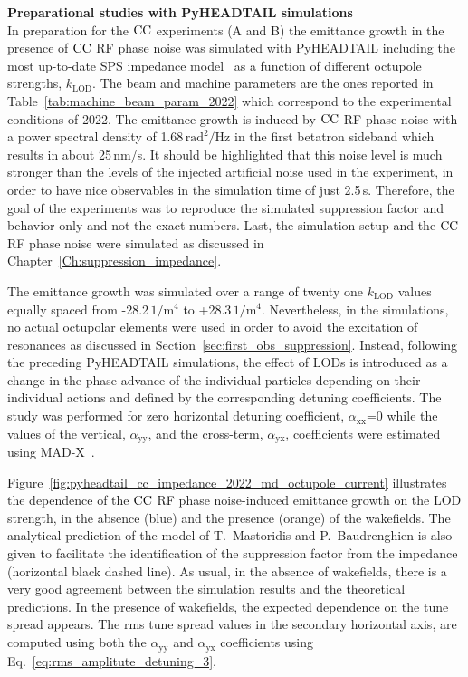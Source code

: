 \textbf{Preparational studies with PyHEADTAIL simulations}\\
In preparation for the ${\mathrm{CC}}$ experiments (A and B) the emittance growth in the presence of ${\mathrm{CC}}$ RF phase noise was simulated with PyHEADTAIL including the most up-to-date SPS impedance model~\cite{updated_sps_wakfields_model} as a function of different octupole strengths, $k_{\mathrm{LOD}}$. The beam and machine parameters are the ones reported in Table~\ref{tab:machine_beam_param_2022} which correspond to the experimental conditions of 2022. The emittance growth is induced by ${\mathrm{CC}}$ RF phase noise with a power spectral density of 1.68\,$\mathrm{rad^2/Hz}$ in the first betatron sideband which results in about 25\,nm/s. It should be highlighted that this noise level is much stronger than the levels of the injected artificial noise used in the experiment, in order to have nice observables in the simulation time of just 2.5\,s. Therefore, the goal of the experiments was to reproduce the simulated suppression factor and behavior only and not the exact numbers. Last, the simulation setup and the ${\mathrm{CC}}$ RF phase noise were simulated as discussed in Chapter~\ref{Ch:suppression_impedance}. 

The emittance growth was simulated over a range of twenty one $k_\mathrm{LOD}$ values equally spaced from -28.2\,$\mathrm{1/m^4}$ to +28.3\,$\mathrm{1/m^4}$. Nevertheless, in the simulations, no actual octupolar elements were used in order to avoid the excitation of resonances as discussed in Section~\ref{sec:first_obs_suppression}. Instead, following the preceding PyHEADTAIL simulations, the effect of LODs is introduced as a change in the phase advance of the individual particles depending on their individual actions and defined by the corresponding detuning coefficients. The study was performed for zero horizontal detuning coefficient, $\alpha_{\mathrm{xx}}$=0 while the values of the vertical, $\alpha_{\mathrm{yy}}$, and the cross-term, $\alpha_{\mathrm{yx}}$, coefficients were estimated using MAD-X~\cite{madx}.

Figure~\ref{fig:pyheadtail_cc_impedance_2022_md_octupole_current} illustrates the dependence of the ${\mathrm{CC}}$ RF phase noise-induced emittance growth on the LOD strength, in the absence (blue) and the presence (orange) of the wakefields. The analytical prediction of the model of T.~Mastoridis and P.~Baudrenghien is also given to facilitate the identification of the suppression factor from the impedance (horizontal black dashed line). As usual, in the absence of wakefields, there is a very good agreement between the simulation results and the theoretical predictions. In the presence of wakefields, the expected dependence on the tune spread appears. The rms tune spread values in the secondary horizontal axis, are computed using both the $\alpha_{\mathrm{yy}}$ and $\alpha_{\mathrm{yx}}$ coefficients using Eq.~\eqref{eq:rms_amplitute_detuning_3}.


